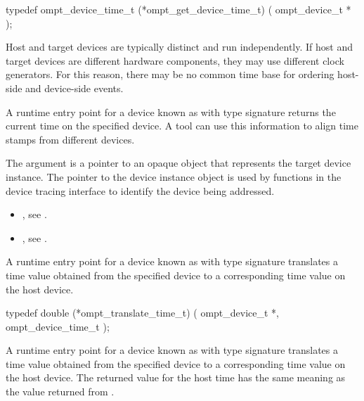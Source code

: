 \format
\begin{ccppspecific}
\begin{omptInquiry}
typedef ompt_device_time_t (*ompt_get_device_time_t) (
  ompt_device_t *
);
\end{omptInquiry}
\end{ccppspecific}

\descr
Host and target devices are typically distinct and run independently.
If host and target devices are different hardware components, they
may use different clock generators. For this reason,  there may be
no common time base for ordering host-side and device-side events.

A runtime entry point for a device known
as  with type signature
returns the current time on the specified device.
A tool can use this information
to align time stamps from different devices.

\argdesc

The argument  is a pointer to an opaque object that
represents the target device instance. The pointer to the device
instance object is used by functions in the device tracing interface
to identify the device being addressed.

\crossreferences
\begin{itemize}
\item {},
see .
\item {},
see .
\end{itemize}

\label{sec:ompt_translate_time_t}

\summary
A runtime entry point for a device known
as 
with type signature  translates
a time value obtained from the specified device to a corresponding time
value on the host device.

\format
\begin{ccppspecific}
\begin{omptInquiry}
typedef double (*ompt_translate_time_t) (
  ompt_device_t *,
  ompt_device_time_t 
);
\end{omptInquiry}
\end{ccppspecific}

\descr
A runtime entry point for a device known as 
with type signature  translates
a time value obtained from the specified device to a corresponding time
value on the host device. The returned value for the host time has
the same meaning as the value returned from .

